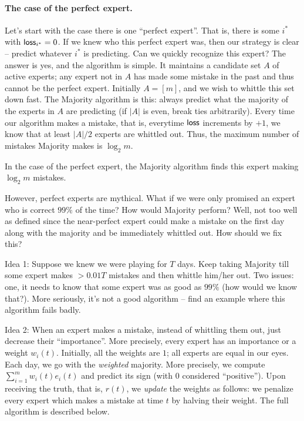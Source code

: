\documentclass[11pt]{article}
\begin{document}
\paragraph{The case of the perfect expert.}

Let's start with the case there is one ``perfect expert''. That is, there is some $i^*$ with $\mathsf{loss}_{i^*} = 0$. If we knew who this perfect expert was, then our strategy is clear -- predict whatever $i^*$ is predicting. Can we quickly recognize this expert? The answer is yes, and the algorithm is simple. It maintains a candidate set $A$ of active experts; any expert not in $A$ has made some mistake in the past and thus cannot be the perfect expert. Initially $A = [m]$, and we wish to whittle this set down fast. The {\sc Majority} algorithm is this: always predict what the majority of the experts in $A$ are predicting (if $|A|$ is even, break ties arbitrarily). Every time our algorithm makes a mistake, that is, everytime $\mathsf{loss}$ increments by $+1$, we know that at least $|A|/2$ experts are whittled out. Thus, the maximum number of mistakes {\sc Majority} makes is $\log_2 m$.

\begin{theorem}
In the case of the perfect expert, the {\sc Majority} algorithm finds this expert making $\log_2 m$ mistakes.
\end{theorem}


However, perfect experts are mythical. What if we were only promised an expert who is correct $99\%$ of the time? How would {\sc Majority} perform? Well, not too well as defined since the near-perfect expert could make a mistake on the first day along with the majority and be immediately whittled out. How should we fix this? 

Idea 1: Suppose we knew we were playing for $T$ days. Keep taking {\sc Majority} till some expert makes $> 0.01T$ mistakes and then whittle him/her out. Two issues: one, it needs to know that some expert was as good as $99\%$ (how would we know that?). More seriously, it's not a good algorithm -- find an example where this algorithm fails badly.  \smallskip

Idea 2: When an expert makes a mistake, instead of whittling them out, just decrease their ``importance''. More precisely, every expert has an importance or a weight $w_i(t)$. Initially, all the weights are $1$; all experts are equal in our eyes. Each day, we go with the {\em weighted} majority. More precisely, we compute $\sum_{i=1}^m w_i(t)e_i(t)$ and predict its sign (with $0$ considered ``positive''). Upon receiving the truth, that is, $r(t)$, we {\em update} the weights as follows: we penalize every expert which makes a mistake at time $t$ by halving their weight. The full algorithm is described below.
\end{document}

